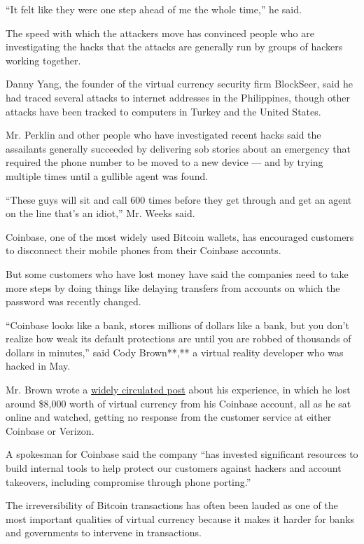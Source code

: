 ``It felt like they were one step ahead of me the whole time,'' he said.

The speed with which the attackers move has convinced people who are
investigating the hacks that the attacks are generally run by groups of
hackers working together.

Danny Yang, the founder of the virtual currency security firm BlockSeer,
said he had traced several attacks to internet addresses in the
Philippines, though other attacks have been tracked to computers in
Turkey and the United States.

Mr. Perklin and other people who have investigated recent hacks said the
assailants generally succeeded by delivering sob stories about an
emergency that required the phone number to be moved to a new device ---
and by trying multiple times until a gullible agent was found.

``These guys will sit and call 600 times before they get through and get
an agent on the line that's an idiot,'' Mr. Weeks said.

Coinbase, one of the most widely used Bitcoin wallets, has encouraged
customers to disconnect their mobile phones from their Coinbase
accounts.

But some customers who have lost money have said the companies need to
take more steps by doing things like delaying transfers from accounts on
which the password was recently changed.

``Coinbase looks like a bank, stores millions of dollars like a bank,
but you don't realize how weak its default protections are until you are
robbed of thousands of dollars in minutes,'' said Cody Brown**,** a
virtual reality developer who was hacked in May.

Mr. Brown wrote a
\href{https://medium.com/@CodyBrown/how-to-lose-8k-worth-of-bitcoin-in-15-minutes-with-verizon-and-coinbase-com-ba75fb8d0bac}{widely
circulated post} about his experience, in which he lost around \$8,000
worth of virtual currency from his Coinbase account, all as he sat
online and watched, getting no response from the customer service at
either Coinbase or Verizon.

A spokesman for Coinbase said the company ``has invested significant
resources to build internal tools to help protect our customers against
hackers and account takeovers, including compromise through phone
porting.''

The irreversibility of Bitcoin transactions has often been lauded as one
of the most important qualities of virtual currency because it makes it
harder for banks and governments to intervene in transactions.

